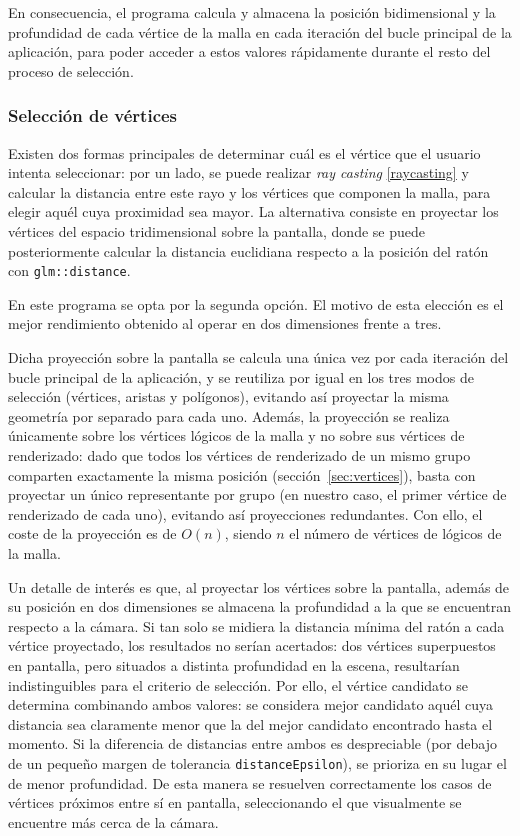 En consecuencia, el programa calcula y almacena la posición bidimensional y la profundidad de cada vértice de la malla en cada iteración del bucle principal de la aplicación, para poder acceder a estos valores rápidamente durante el resto del proceso de selección.

\subsubsection{Selección de vértices}

Existen dos formas principales de determinar cuál es el vértice que el usuario intenta seleccionar: por un lado, se puede realizar \textit{ray casting} \ref{raycasting} y calcular la distancia entre este rayo y los vértices que componen la malla, para elegir aquél cuya proximidad sea mayor. La alternativa consiste en proyectar los vértices del espacio tridimensional sobre la pantalla, donde se puede posteriormente calcular la distancia euclidiana respecto a la posición del ratón con \texttt{glm::distance}.

En este programa se opta por la segunda opción. El motivo de esta elección es el mejor rendimiento obtenido al operar en dos dimensiones frente a tres.

Dicha proyección sobre la pantalla se calcula una única vez por cada iteración del bucle principal de la aplicación, y se reutiliza por igual en los tres modos de selección (vértices, aristas y polígonos), evitando así proyectar la misma geometría por separado para cada uno. Además, la proyección se realiza únicamente sobre los vértices lógicos de la malla y no sobre sus vértices de renderizado: dado que todos los vértices de renderizado de un mismo grupo comparten exactamente la misma posición (sección~\ref{sec:vertices}), basta con proyectar un único representante por grupo (en nuestro caso, el primer vértice de renderizado de cada uno), evitando así proyecciones redundantes. Con ello, el coste de la proyección es de $O(n)$, siendo $n$ el número de vértices de lógicos de la malla.

Un detalle de interés es que, al proyectar los vértices sobre la pantalla, además de su posición en dos dimensiones se almacena la profundidad a la que se encuentran respecto a la cámara. Si tan solo se midiera la distancia mínima del ratón a cada vértice proyectado, los resultados no serían acertados: dos vértices superpuestos en pantalla, pero situados a distinta profundidad en la escena, resultarían indistinguibles para el criterio de selección. Por ello, el vértice candidato se determina combinando ambos valores: se considera mejor candidato aquél cuya distancia sea claramente menor que la del mejor candidato encontrado hasta el momento. Si la diferencia de distancias entre ambos es despreciable (por debajo de un pequeño margen de tolerancia \texttt{distanceEpsilon}), se prioriza en su lugar el de menor profundidad. De esta manera se resuelven correctamente los casos de vértices próximos entre sí en pantalla, seleccionando el que visualmente se encuentre más cerca de la cámara.

